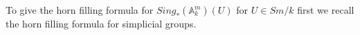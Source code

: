 \documentclass[11pt, reqno]{amsart}
\theoremstyle{plain}
\theoremstyle{definition}
\newcommand{\Spec}{{\rm Spec \,}}
\newcommand{\sO}{{\mathcal O}}
\newcommand{\A}{{\mathbb A}}
\begin{document}
To give the horn filling formula for $Sing_*(\A^m_k)(U)$ for $U \in Sm/k$ first we recall the horn filling formula for simplicial groups.
\end{document}
